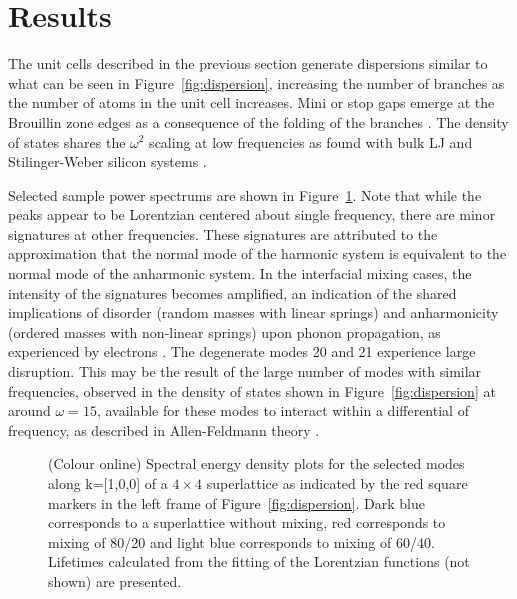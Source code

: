 \documentclass[aps,prb,preprint,preprintnumbers,amsmath,amssymb,floatfix,superscriptaddress]{revtex4}
\begin{document}
\section{Results}
The unit cells described in the previous section generate dispersions similar to what can be seen in Figure~\ref{fig:dispersion}, increasing the number of branches as the number of atoms in the unit cell increases. Mini or stop gaps emerge at the Brouillin zone edges as a consequence of the folding of the branches \cite{PhysRevB.38.1427} \cite{PhysRevB.60.2627}. The density of states shares the $\omega^2$ scaling at low frequencies as found with bulk LJ and Stilinger-Weber silicon systems \cite{}. 
\renewcommand{\topfraction}{0.7}
\begin{figure*}[ht!]
\begin{center}
\renewcommand{\figure}{Fig.}
\caption{Dispersion of a 4x4 superlattice for modes normal to the interfaces. Red squares represent select modes for $\pmb{\kappa}$=[1,0,0].}
\label{fig:dispersion}
\end{center}
\end{figure*}
Selected sample power spectrums are shown in Figure~\ref{fig:sed}. Note that while the peaks appear to be Lorentzian centered about single frequency, there are minor signatures at other frequencies. These signatures are attributed to the approximation that the normal mode of the harmonic system is equivalent to the normal mode of the anharmonic system. In the interfacial mixing cases, the intensity of the signatures becomes amplified, an indication of the shared implications of disorder (random masses with linear springs) and anharmonicity (ordered masses with non-linear springs) \cite{RevModPhys.53.175} upon phonon propagation, as experienced by electrons \cite{mott1961theory}. The degenerate modes 20 and 21 experience large disruption. This may be the result of the large number of modes with similar frequencies, observed in the density of states shown in Figure~\ref{fig:dispersion} at around $\omega=15$, available for these modes to interact within a differential of frequency, as described in Allen-Feldmann theory \cite{allen_thermal_1993,feldman_thermal_1993-1}.
\begin{figure}[!h]
\begin{center}
\renewcommand{\figure}{Fig.}
\caption{(Colour online) Spectral energy density plots for the selected modes along k=[1,0,0] of a $4\times4$ superlattice as indicated by the red square markers in the left frame of Figure~\ref{fig:dispersion}. Dark blue corresponds to a superlattice without mixing, red corresponds to mixing of 80/20 and light blue corresponds to mixing of 60/40. Lifetimes calculated from the fitting of the Lorentzian functions (not shown) are presented.}
\label{fig:sed}
\end{center}
\end{figure}
\end{document}
